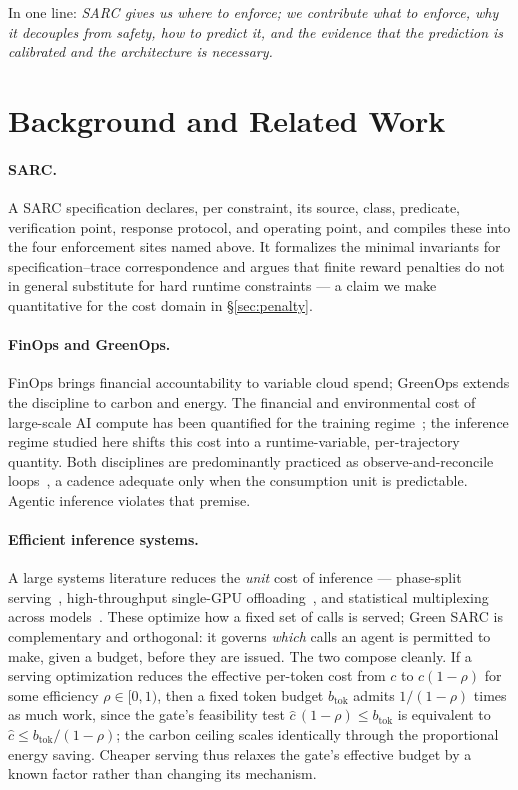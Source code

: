 \documentclass[11pt]{article}
\theoremstyle{plain}
\theoremstyle{definition}
\theoremstyle{remark}
\newcommand{\btok}{b_{\mathrm{tok}}}
\begin{document}
In one line: \emph{SARC gives us where to enforce; we contribute what to enforce, why it decouples from safety, how to predict it, and the evidence that the prediction is calibrated and the architecture is necessary.}

\section{Background and Related Work}\label{sec:related}

\paragraph{SARC.} A SARC specification declares, per constraint, its source, class, predicate, verification point, response protocol, and operating point, and compiles these into the four enforcement sites named above. It formalizes the minimal invariants for specification--trace correspondence and argues that finite reward penalties do not in general substitute for hard runtime constraints --- a claim we make quantitative for the cost domain in \S\ref{sec:penalty}.

\paragraph{FinOps and GreenOps.} FinOps brings financial accountability to variable cloud spend; GreenOps extends the discipline to carbon and energy. The financial and environmental cost of large-scale AI compute has been quantified for the training regime~\cite{strubell2019,patterson2021,lacoste2019}; the inference regime studied here shifts this cost into a runtime-variable, per-trajectory quantity. Both disciplines are predominantly practiced as observe-and-reconcile loops~\cite{finops}, a cadence adequate only when the consumption unit is predictable. Agentic inference violates that premise.

\paragraph{Efficient inference systems.} A large systems literature reduces the \emph{unit} cost of inference --- phase-split serving~\cite{splitwise}, high-throughput single-GPU offloading~\cite{flexgen}, and statistical multiplexing across models~\cite{alpaserve}. These optimize how a fixed set of calls is served; Green SARC is complementary and orthogonal: it governs \emph{which} calls an agent is permitted to make, given a budget, before they are issued. The two compose cleanly. If a serving optimization reduces the effective per-token cost from $c$ to $c(1-\rho)$ for some efficiency $\rho\in[0,1)$, then a fixed token budget $\btok$ admits $1/(1-\rho)$ times as much work, since the gate's feasibility test $\hat c\,(1-\rho)\le \btok$ is equivalent to $\hat c \le \btok/(1-\rho)$; the carbon ceiling scales identically through the proportional energy saving. Cheaper serving thus relaxes the gate's effective budget by a known factor rather than changing its mechanism.
\end{document}
